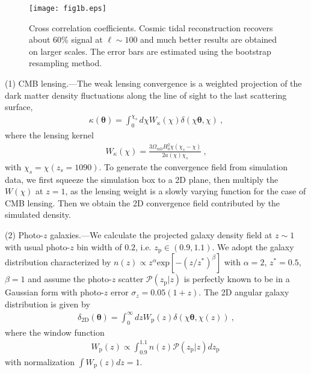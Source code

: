 \documentclass[aps,prl,twocolumn,showpacs,superscriptaddress,groupedaddress,nofootinbib]{revtex4}  %
\newcommand{\mr}{\mathrm}
\begin{document}
\begin{figure}[tbp]
\begin{center}
\texttt{[image: fig1b.eps]}
\end{center}
\vspace{-0.7cm}
\caption{Cross correlation coefficients. Cosmic tidal reconstruction recovers 
about 60\% signal at $\ell\sim100$ and much better results are obtained on 
larger scales. The error bars are estimated using the bootstrap resampling 
method.}
\label{fig:cc}
\end{figure}


(1) CMB lensing.---The weak lensing convergence is a weighted projection
of the dark matter density fluctuations along the line of sight to the last 
scattering surface,
\begin{eqnarray}
\kappa(\bm{\theta})=\int_0^{\chi_s}d\chi 
W_\kappa(\chi)\delta(\chi\bm{\theta},\chi)\ ,
\end{eqnarray}
where the lensing kernel
\begin{eqnarray}
W_\kappa(\chi)=\frac{3\Omega_{m0}H_0^2\chi(\chi_s-\chi)}{2a(\chi)\chi_s}\ ,
\end{eqnarray}
with $\chi_s=\chi(z_s=1090)$.
To generate the convergence field from simulation data, we first squeeze the 
simulation box to a 2D plane, then multiply the $W(\chi)$ at $z=1$, as the 
lensing weight is a slowly varying function for the case of CMB lensing.
Then we obtain the 2D convergence field contributed by the simulated density.

(2) Photo-$z$ galaxies.---We calculate the projected galaxy density field at 
$z\sim 1$ with usual photo-$z$ bin width of $0.2$, i.e. $z_\mr{p}\in(0.9,1.1)$. 
We adopt the galaxy distribution characterized by 
$n(z)\propto z^{\alpha}\mr{exp}[-(z/z^{*})^\beta]$
with $\alpha=2$, $z^*=0.5$, $\beta=1$
and assume the photo-$z$ scatter $\mathcal{P}(z_\mr{p}|z)$ is perfectly known to be in a Gaussian form with photo-$z$ error $\sigma_z=0.05(1+z)$.
The 2D angular galaxy distribution is given by
\begin{eqnarray}
\delta_\mr{2D}(\bm{\theta})=\int_0^\infty dzW_\mr{p}(z)
\delta(\chi\bm{\theta},\chi(z))\ ,
\end{eqnarray}
where the window function 
\begin{eqnarray}
W_\mr{p}(z)\propto\int_{0.9}^{1.1} n(z) \mathcal{P}(z_\mr{p}|z) dz_\mr{p}\ 
\end{eqnarray}
with normalization $\int W_\mr{p}(z)dz=1$.
\end{document}
